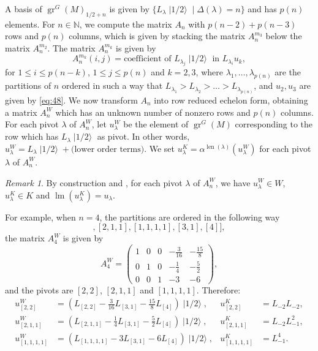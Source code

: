 \documentclass[a4paper, 12pt, reqno]{amsart}
\theoremstyle{remark}
\newtheorem{remark}[theorem]{Remark}
\DeclareMathOperator{\gr}{gr}
\DeclareMathOperator{\lm}{lm}
\DeclareMathOperator{\len}{len}
\DeclareMathOperator{\vachalf}{|1/2\rangle}
\begin{document}
A basis of $\gr^G(M)_{1/2 + n}$ is given by $\{L_{\lambda}\vachalf \mid \Delta(\lambda) = n\}$ and has $p(n)$ elements.
For $n \in \mathbb{N}$, we compute the matrix $A_n$ with $p(n - 2) + p(n - 3)$ rows and $p(n)$ columns, which is given by stacking the matrix $A^{m_3}_n$ below the matrix $A^{m_2}_n$.
The matrix $A^{m_k}_n$ is given by
\begin{equation*}
  A^{m_k}_n(i, j) = \text{coefficient of $L_{\lambda_j}\vachalf$ in $L_{\lambda_i}u_k$},
\end{equation*}
for $1 \le i \le p(n - k)$, $1 \le j \le p(n)$ and $k = 2, 3$, where $\lambda_1, \dots, \lambda_{p(n)}$ are the partitions of $n$ ordered in such a way that $L_{\lambda_1} > L_{\lambda_2} > \dots > L_{\lambda_{p(n)}}$, and $u_2, u_3$ are given by \eqref{eq:48}.
We now transform $A_n$ into row reduced echelon form, obtaining a matrix $A^W_n$ which has an unknown number of nonzero rows and $p(n)$ columns.
For each pivot $\lambda$ of $A^W_n$, let $u^W_{\lambda}$ be the element of $\gr^G(M)$ corresponding to the row which has $L_{\lambda}\vachalf$ as pivot.
In other words, $u^W_{\lambda} = L_{\lambda}\vachalf + \text{(lower order terms)}$.
We set $u^K_{\lambda} = \alpha^{\len(\lambda)}(u^W_{\lambda})$ for each pivot $\lambda$ of $A^W_n$.

\begin{remark}
  \label{rmk:49}
  By construction and , for each pivot $\lambda$ of $A^W_n$, we have $u^W_{\lambda} \in W$, $u^K_{\lambda} \in K$ and $\lm(u^K_{\lambda}) = u_{\lambda}$.
\end{remark}

For example, when $n = 4$, the partitions are ordered in the following way
\begin{equation*}
  [[2, 2], [2, 1, 1], [1, 1, 1, 1], [3, 1], [4]],
\end{equation*}
the matrix $A^W_4$ is given by
\begin{equation*}
  A^W_4=
  \begin{pmatrix}
    1 & 0 & 0 & -\frac{3}{16} & -\frac{15}{8} \\
    0 & 1 & 0 & -\frac{1}{4} & -\frac{5}{2} \\
    0 & 0 & 1 & -3 & -6
  \end{pmatrix},
\end{equation*}
and the pivots are $[2, 2]$, $[2, 1, 1]$ and $[1, 1, 1, 1]$.
Therefore:
\begin{align*}
  u^W_{[2, 2]} &= (L_{[2, 2]} - \tfrac{3}{16}L_{[3, 1]} - \tfrac{15}{8}L_{[4]})\vachalf, &u^K_{[2, 2]} &= L_{-2}L_{-2}, \\
  u^W_{[2, 1, 1]} &= (L_{[2, 1, 1]} - \tfrac{1}{4}L_{[3, 1]} - \tfrac{5}{2}L_{[4]})\vachalf, &u^K_{[2, 1, 1]} &= L_{-2}L_{-1}^2, \\
  u^W_{[1, 1, 1, 1]} &= (L_{[1, 1, 1, 1]} - 3L_{[3, 1]} - 6L_{[4]})\vachalf, &u^K_{[1, 1, 1, 1]} &= L_{-1}^4.
\end{align*}
\end{document}
